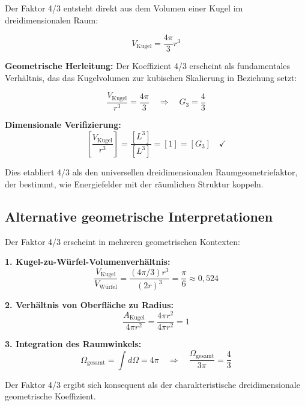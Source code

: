 \documentclass[12pt,a4paper]{report}
\begin{document}
	Der Faktor 4/3 entsteht direkt aus dem Volumen einer Kugel im dreidimensionalen Raum:
	
	\begin{equation}
		V_{\text{Kugel}} = \frac{4\pi}{3} r^3
	\end{equation}
	
	\textbf{Geometrische Herleitung:}
	Der Koeffizient 4/3 erscheint als fundamentales Verhältnis, das das Kugelvolumen zur kubischen Skalierung in Beziehung setzt:
	
	\begin{equation}
		\frac{V_{\text{Kugel}}}{r^3} = \frac{4\pi}{3} \quad \Rightarrow \quad G_3 = \frac{4}{3}
	\end{equation}
	
	\textbf{Dimensionale Verifizierung:}
	\begin{equation}
		\left[\frac{V_{\text{Kugel}}}{r^3}\right] = \frac{[L^3]}{[L^3]} = [1] = [G_3] \quad \checkmark
	\end{equation}
	
	Dies etabliert 4/3 als den universellen dreidimensionalen Raumgeometriefaktor, der bestimmt, wie Energiefelder mit der räumlichen Struktur koppeln.
	
	\subsection{Alternative geometrische Interpretationen}
	\label{subsec:alternative_interpretations}
	
	Der Faktor 4/3 erscheint in mehreren geometrischen Kontexten:
	
	\textbf{1. Kugel-zu-Würfel-Volumenverhältnis:}
	\begin{equation}
		\frac{V_{\text{Kugel}}}{V_{\text{Würfel}}} = \frac{(4\pi/3)r^3}{(2r)^3} = \frac{\pi}{6} \approx 0,524
	\end{equation}
	
	\textbf{2. Verhältnis von Oberfläche zu Radius:}
	\begin{equation}
		\frac{A_{\text{Kugel}}}{4\pi r^2} = \frac{4\pi r^2}{4\pi r^2} = 1
	\end{equation}
	
	\textbf{3. Integration des Raumwinkels:}
	\begin{equation}
		\Omega_{\text{gesamt}} = \int d\Omega = 4\pi \quad \Rightarrow \quad \frac{\Omega_{\text{gesamt}}}{3\pi} = \frac{4}{3}
	\end{equation}
	
	Der Faktor 4/3 ergibt sich konsequent als der charakteristische dreidimensionale geometrische Koeffizient.
	
\end{document}
